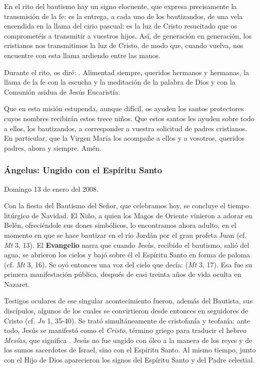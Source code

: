 \begin{body}
\begin{body}
{En el rito del bautismo hay un signo elocuente, que expresa precisamente la transmisión de la fe: es la entrega, a cada uno de los bautizandos, de una vela encendida en la llama del cirio pascual: es la luz de Cristo resucitado que os comprometéis a transmitir a vuestros hijos. Así, de generación en generación, los cristianos nos transmitimos la luz de Cristo, de modo que, cuando vuelva, nos encuentre con esta llama ardiendo entre las manos.

Durante el rito, os diré: . Alimentad siempre, queridos hermanos y hermanas, la llama de la fe con la escucha y la meditación de la palabra de Dios y con la Comunión asidua de Jesús Eucaristía.

Que en esta misión estupenda, aunque difícil, os ayuden los santos protectores cuyos nombres recibirán estos trece niños. Que estos santos les ayuden sobre todo a ellos, los bautizandos, a corresponder a vuestra solicitud de padres cristianos. En particular, que la Virgen María los acompañe a ellos y a vosotros, queridos padres, ahora y siempre. Amén.

\subsubsection{Ángelus: Ungido con el Espíritu Santo}

Domingo 13 de enero del 2008.

Con la fiesta del Bautismo del Señor, que celebramos hoy, se concluye el tiempo litúrgico de Navidad. El Niño, a quien los Magos de Oriente vinieron a adorar en Belén, ofreciéndole sus dones simbólicos, lo encontramos ahora adulto, en el momento en que se hace bautizar en el río Jordán por el gran profeta Juan (cf. \emph{Mt} 3, 13). El \textbf{Evangelio} narra que cuando Jesús, recibido el bautismo, salió del agua, se abrieron los cielos y bajó sobre él el Espíritu Santo en forma de paloma (cf. \emph{Mt} 3, 16). Se oyó entonces una voz del cielo que decía:  (\emph{Mt} 3, 17). Esa fue su primera manifestación pública, después de casi treinta años de vida oculta en Nazaret.

Testigos oculares de ese singular acontecimiento fueron, además del Bautista, sus discípulos, algunos de los cuales se convirtieron desde entonces en seguidores de Cristo (cf. \emph{Jn} 1, 35-40). Se trató simultáneamente de cristofanía y teofanía: ante todo, Jesús se manifestó como el \emph{Cristo}, término griego para traducir el hebreo \emph{Mesías}, que significa . Jesús no fue ungido con óleo a la manera de los reyes y de los sumos sacerdotes de Israel, sino con el Espíritu Santo. Al mismo tiempo, junto con el Hijo de Dios aparecieron los signos del Espíritu Santo y del Padre celestial.

}
\end{body}
\end{body}
